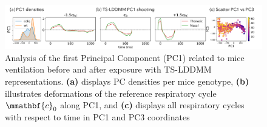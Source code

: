 \begin{figure}[t]
  \centering
  \includegraphics[width=0.95\linewidth]{pictures/exp after/exp after.pdf}
  \caption{Analysis of the first Principal Component (PC1) related to mice ventilation before and after exposure with TS-LDDMM representations. \textbf{(a)} displays PC densities per mice genotype, \textbf{(b)} illustrates deformations of the reference respiratory cycle $\mmathbf{c}_0$ along PC1, and \textbf{(c)} displays all respiratory cycles with respect to time in PC1 and PC3 coordinates}
  \label{fig:exp_2_PCAold}
  \vspace{-1.5em}
\end{figure}
\vspace{-1ex}
